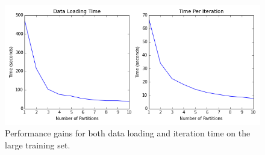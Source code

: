 \begin{figure}[h]
\begin{center}
\includegraphics[scale=0.7]{big_metrics.png}
\caption{Performance gains for both data loading and iteration time on the large training set.}
\label{fig:big}
\end{center}
\end{figure}